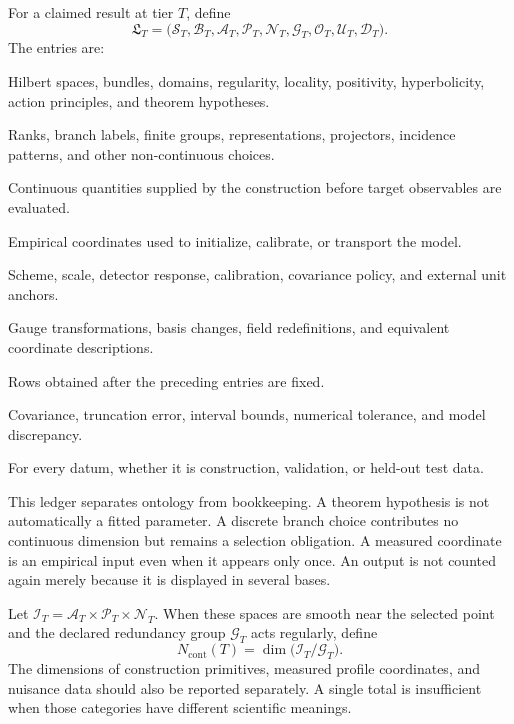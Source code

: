 \documentclass[11pt]{article}
\newcommand{\Profile}{\mathcal P}
\newcommand{\Inputs}{\mathcal I}
\newcommand{\Outputs}{\mathcal O}
\newcommand{\Data}{\mathcal D}
\newcommand{\Redundancy}{\mathcal G}
\newcommand{\Ledger}{\mathfrak L}
\begin{document}
\begin{definition}
\label{def:ledger}
For a claimed result at tier \(T\), define
\[
\Ledger_T=
\bigl(
\mathcal S_T,\mathcal B_T,\mathcal A_T,\Profile_T,\mathcal N_T,
\Redundancy_T,\Outputs_T,\mathcal U_T,\Data_T
\bigr).
\]
The entries are:
\begin{description}[leftmargin=2.8cm,style=nextline]
\item[\(\mathcal S_T\): structural assumptions]
Hilbert spaces, bundles, domains, regularity, locality, positivity,
hyperbolicity, action principles, and theorem hypotheses.
\item[\(\mathcal B_T\): selected discrete data]
Ranks, branch labels, finite groups, representations, projectors, incidence
patterns, and other non-continuous choices.
\item[\(\mathcal A_T\): construction primitives]
Continuous quantities supplied by the construction before target observables
are evaluated.
\item[\(\Profile_T\): measured source profile]
Empirical coordinates used to initialize, calibrate, or transport the model.
\item[\(\mathcal N_T\): nuisance and metrology data]
Scheme, scale, detector response, calibration, covariance policy, and
external unit anchors.
\item[\(\Redundancy_T\): redundancies and conventions]
Gauge transformations, basis changes, field redefinitions, and equivalent
coordinate descriptions.
\item[\(\Outputs_T\): outputs]
Rows obtained after the preceding entries are fixed.
\item[\(\mathcal U_T\): uncertainty record]
Covariance, truncation error, interval bounds, numerical tolerance, and model
discrepancy.
\item[\(\Data_T\): data-use map]
For every datum, whether it is construction, validation, or held-out test
data.
\end{description}
\end{definition}

This ledger separates ontology from bookkeeping. A theorem hypothesis is not
automatically a fitted parameter. A discrete branch choice contributes no
continuous dimension but remains a selection obligation. A measured
coordinate is an empirical input even when it appears only once. An output
is not counted again merely because it is displayed in several bases.

\begin{definition}
\label{def:count}
Let \(\Inputs_T=\mathcal A_T\times\Profile_T\times\mathcal N_T\).
When these spaces are smooth near the selected point and the declared
redundancy group \(\Redundancy_T\) acts regularly, define
\[
N_{\mathrm{cont}}(T)
=
\dim\bigl(\Inputs_T/\Redundancy_T\bigr).
\]
The dimensions of construction primitives, measured profile coordinates,
and nuisance data should also be reported separately. A single total is
insufficient when those categories have different scientific meanings.
\end{definition}
\end{document}
